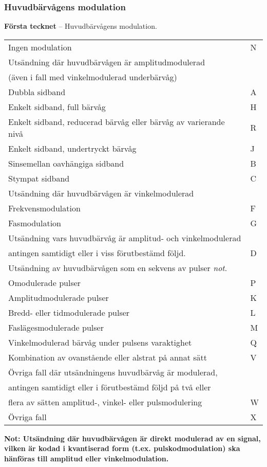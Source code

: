 \subsubsection{Huvudbärvågens modulation}
\textbf{Första tecknet} -- Huvudbärvågens modulation.\\
\begin{tabular}{ll}
	Ingen modulation & N\\
	Utsändning där huvudbärvågen är amplitudmodulerad &\\
	(även i fall med vinkelmodulerad underbärvåg) &\\
	Dubbla sidband & A\\
	Enkelt sidband, full bärvåg & H\\
	Enkelt sidband, reducerad bärvåg eller bärvåg av varierande nivå & R\\
	Enkelt sidband, undertryckt bärvåg & J\\
	Sinsemellan oavhängiga sidband & B\\
	Stympat sidband & C\\
	Utsändning där huvudbärvågen är vinkelmodulerad &\\
	Frekvensmodulation & F\\
	Fasmodulation & G\\
	Utsändning vars huvudbärvåg är amplitud- och vinkelmodulerad &\\
	antingen samtidigt eller i viss förutbestämd följd. & D\\
	Utsändning av huvudbärvågen som en sekvens av pulser \emph{not}. &\\
	Omodulerade pulser & P \\
	Amplitudmodulerade pulser & K\\
	Bredd- eller tidmodulerade pulser & L\\
	Faslägesmodulerade pulser & M\\
	Vinkelmodulerad bärvåg under pulsens varaktighet & Q\\
	Kombination av ovanstående eller alstrat på annat sätt & V\\
	Övriga fall där utsändningens huvudbärvåg är modulerad, &\\
	antingen samtidigt eller i förutbestämd följd på två eller &\\
	flera av sätten amplitud-, vinkel- eller pulsmodulering & W\\
	Övriga fall & X\\
\end{tabular}

\textbf{Not: Utsändning där huvudbärvågen är direkt modulerad av en signal,
  vilken är kodad i kvantiserad form (t.ex. pulskodmodulation) ska hänföras till
  amplitud eller vinkelmodulation.}

